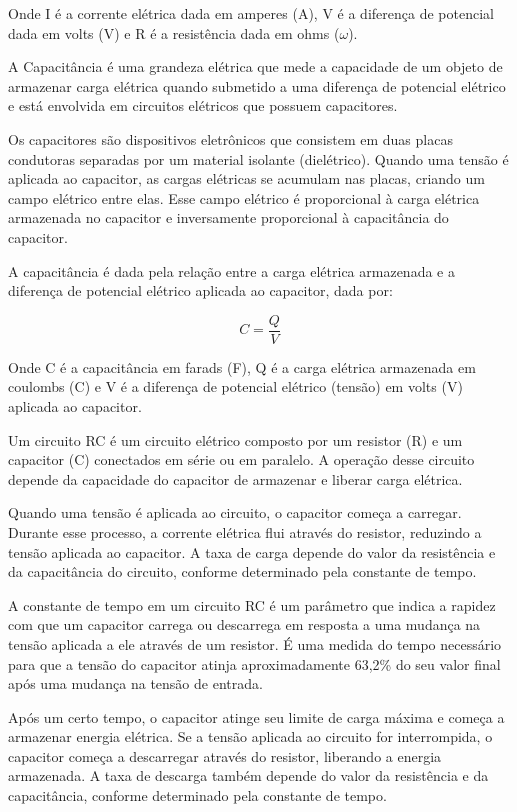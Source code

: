 \documentclass[11pt,a4paper]{article}
\begin{document}
			\noindent Onde I é a corrente elétrica dada em amperes (A), V é a diferença de potencial dada em volts (V) e R é a resistência dada em ohms ($\omega$).

			A Capacitância é uma grandeza elétrica que mede a capacidade de um objeto de armazenar carga elétrica quando submetido a uma diferença de potencial elétrico e está envolvida em circuitos elétricos que possuem capacitores.
			
			Os capacitores são dispositivos eletrônicos que consistem em duas placas condutoras separadas por um material isolante (dielétrico). Quando uma tensão é aplicada ao capacitor, as cargas elétricas se acumulam nas placas, criando um campo elétrico entre elas. Esse campo elétrico é proporcional à carga elétrica armazenada no capacitor e inversamente proporcional à capacitância do capacitor.

			A capacitância é dada pela relação entre a carga elétrica armazenada e a diferença de potencial elétrico aplicada ao capacitor, dada por:

				\begin{equation}
					C = \frac{Q}{V}
				\end{equation}

			\noindent Onde C é a capacitância em farads (F), Q é a carga elétrica armazenada em coulombs (C) e V é a diferença de potencial elétrico (tensão) em volts (V) aplicada ao capacitor.
			
			Um circuito RC é um circuito elétrico composto por um resistor (R) e um capacitor (C) conectados em série ou em paralelo. A operação desse circuito depende da capacidade do capacitor de armazenar e liberar carga elétrica.

			Quando uma tensão é aplicada ao circuito, o capacitor começa a carregar. Durante esse processo, a corrente elétrica flui através do resistor, reduzindo a tensão aplicada ao capacitor. A taxa de carga depende do valor da resistência e da capacitância do circuito, conforme determinado pela constante de tempo.

			A constante de tempo em um circuito RC é um parâmetro que indica a rapidez com que um capacitor carrega ou descarrega em resposta a uma mudança na tensão aplicada a ele através de um resistor. É uma medida do tempo necessário para que a tensão do capacitor atinja aproximadamente 63,2\% do seu valor final após uma mudança na tensão de entrada.

			Após um certo tempo, o capacitor atinge seu limite de carga máxima e começa a armazenar energia elétrica. Se a tensão aplicada ao circuito for interrompida, o capacitor começa a descarregar através do resistor, liberando a energia armazenada. A taxa de descarga também depende do valor da resistência e da capacitância, conforme determinado pela constante de tempo.
			
\end{document}
